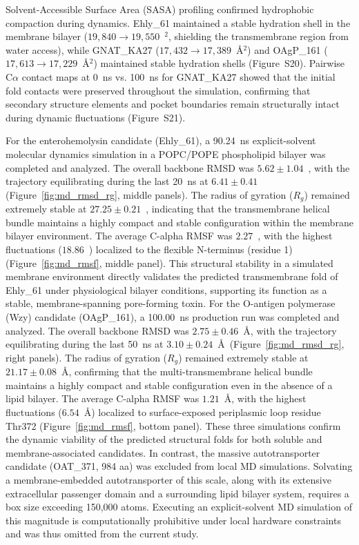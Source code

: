 \documentclass[pdflatex,sn-mathphys-num]{sn-jnl}
\begin{document}
Solvent-Accessible Surface Area (SASA) profiling confirmed hydrophobic compaction during dynamics. Ehly\_61 maintained a stable hydration shell in the membrane bilayer ($19,840 \to 19,550$~\text{\AA}$^2$, shielding the transmembrane region from water access), while GNAT\_KA27 ($17,432 \to 17,389$~\AA$^2$) and OAgP\_161 ($17,613 \to 17,229$~\AA$^2$) maintained stable hydration shells (Figure~S20). Pairwise C$\alpha$ contact maps at 0~ns vs. 100~ns for GNAT\_KA27 showed that the initial fold contacts were preserved throughout the simulation, confirming that secondary structure elements and pocket boundaries remain structurally intact during dynamic fluctuations (Figure~S21).

For the enterohemolysin candidate (Ehly\_61), a 90.24~ns explicit-solvent molecular dynamics simulation in a POPC/POPE phospholipid bilayer was completed and analyzed. The overall backbone RMSD was $5.62 \pm 1.04$~\text{\AA}, with the trajectory equilibrating during the last 20~ns at $6.41 \pm 0.41$~\text{\AA} (Figure~\ref{fig:md_rmsd_rg}, middle panels). The radius of gyration ($R_g$) remained extremely stable at $27.25 \pm 0.21$~\text{\AA}, indicating that the transmembrane helical bundle maintains a highly compact and stable configuration within the membrane bilayer environment. The average C-alpha RMSF was $2.27$~\text{\AA}, with the highest fluctuations ($18.86$~\text{\AA}) localized to the flexible N-terminus (residue 1) (Figure~\ref{fig:md_rmsf}, middle panel). This structural stability in a simulated membrane environment directly validates the predicted transmembrane fold of Ehly\_61 under physiological bilayer conditions, supporting its function as a stable, membrane-spanning pore-forming toxin. For the O-antigen polymerase (Wzy) candidate (OAgP\_161), a 100.00~ns production run was completed and analyzed. The overall backbone RMSD was $2.75 \pm 0.46$~\AA, with the trajectory equilibrating during the last 50~ns at $3.10 \pm 0.24$~\AA\ (Figure~\ref{fig:md_rmsd_rg}, right panels). The radius of gyration ($R_g$) remained extremely stable at $21.17 \pm 0.08$~\AA, confirming that the multi-transmembrane helical bundle maintains a highly compact and stable configuration even in the absence of a lipid bilayer. The average C-alpha RMSF was $1.21$~\AA, with the highest fluctuations ($6.54$~\AA) localized to surface-exposed periplasmic loop residue Thr372 (Figure~\ref{fig:md_rmsf}, bottom panel). These three simulations confirm the dynamic viability of the predicted structural folds for both soluble and membrane-associated candidates. In contrast, the massive autotransporter candidate (OAT\_371, 984 aa) was excluded from local MD simulations. Solvating a membrane-embedded autotransporter of this scale, along with its extensive extracellular passenger domain and a surrounding lipid bilayer system, requires a box size exceeding 150,000 atoms. Executing an explicit-solvent MD simulation of this magnitude is computationally prohibitive under local hardware constraints and was thus omitted from the current study. 
\end{document}
